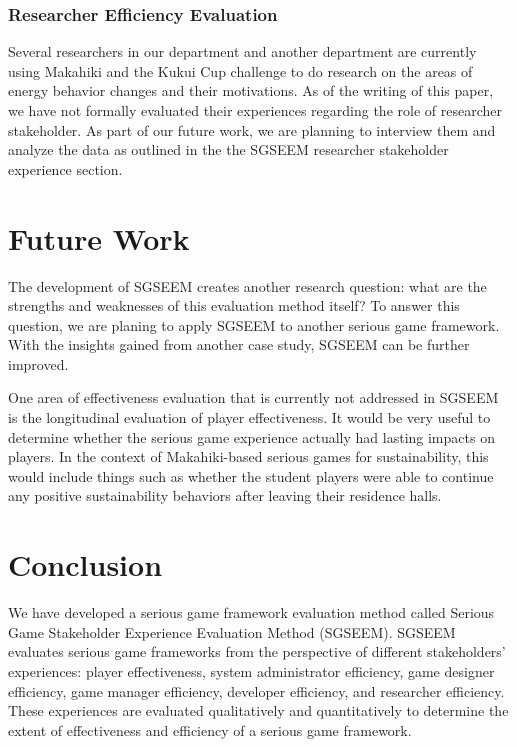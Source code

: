 \documentclass{sigchi}
\begin{document}
\subsubsection{Researcher Efficiency Evaluation}

Several researchers in our department and another department are currently using
 Makahiki and the Kukui Cup challenge to do research on the areas of energy behavior
 changes and their motivations. As of the writing of this paper, we have not formally evaluated their experiences regarding the role of researcher stakeholder. As part of
  our future work, we are planning to interview them and analyze the data as outlined
  in the the SGSEEM researcher stakeholder experience section.

\section{Future Work}

The development of SGSEEM creates another research question:
what are the strengths and weaknesses of this evaluation method itself? To
answer this question, we are planing to apply SGSEEM
to another serious game framework.
With the insights gained from another case study, SGSEEM can be further
improved.

One area of effectiveness evaluation that is currently not addressed in
SGSEEM is the longitudinal evaluation of player effectiveness. It would be
very useful to determine whether the serious game experience actually
had lasting impacts on players. In the context of Makahiki-based serious
games for sustainability, this would include things such as whether the
student players were able to continue any positive sustainability
behaviors after leaving their residence halls.

\section{Conclusion}

We have developed a serious game framework evaluation method called
Serious Game Stakeholder Experience Evaluation Method (SGSEEM). SGSEEM
evaluates serious game frameworks from the perspective of different
stakeholders' experiences: player effectiveness, system administrator efficiency,
game designer efficiency, game manager efficiency,
developer efficiency, and researcher efficiency. These experiences are
evaluated qualitatively and quantitatively to determine the extent of effectiveness
 and efficiency of a serious game framework.
\end{document}
